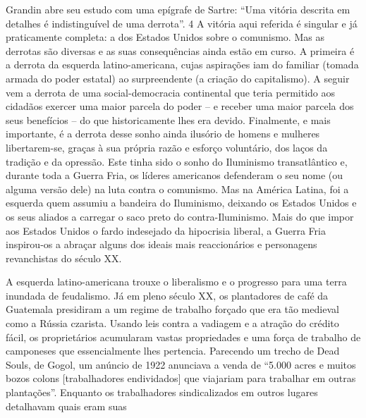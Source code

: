  \par 
Grandin abre seu estudo com uma epígrafe de Sartre: “Uma vitória descrita em detalhes é indistinguível de uma derrota”. {\color{blue}4} A vitória aqui referida é singular e já praticamente completa: a dos Estados Unidos sobre o comunismo. Mas as derrotas são diversas e as suas consequências ainda estão em curso. A primeira é a derrota da esquerda latino-americana, cujas aspirações iam do familiar (tomada armada do poder estatal) ao surpreendente (a criação do capitalismo). A seguir vem a derrota de uma social-democracia continental que teria permitido aos cidadãos exercer uma maior parcela do poder – e receber uma maior parcela dos seus benefícios – do que historicamente lhes era devido. Finalmente, e mais importante, é a derrota desse sonho ainda ilusório de homens e mulheres libertarem-se, graças à sua própria razão e esforço voluntário, dos laços da tradição e da opressão. Este tinha sido o sonho do Iluminismo transatlântico e, durante toda a Guerra Fria, os líderes americanos defenderam o seu nome (ou alguma versão dele) na luta contra o comunismo. Mas na América Latina, foi a esquerda quem assumiu a bandeira do Iluminismo, deixando os Estados Unidos e os seus aliados a carregar o saco preto do contra-Iluminismo. Mais do que impor aos Estados Unidos o fardo indesejado da hipocrisia liberal, a Guerra Fria inspirou-os a abraçar alguns dos ideais mais reaccionários e personagens revanchistas do século XX.
 \par 
A esquerda latino-americana trouxe o liberalismo e o progresso para uma terra inundada de feudalismo. Já em pleno século XX, os plantadores de café da Guatemala presidiram a um regime de trabalho forçado que era tão medieval como a Rússia czarista. Usando leis contra a vadiagem e a atração do crédito fácil, os proprietários acumularam vastas propriedades e uma força de trabalho de camponeses que essencialmente lhes pertencia. Parecendo um trecho de Dead Souls, de Gogol, um anúncio de 1922 anunciava a venda de “5.{\color{blue}000} acres e muitos bozos colons [trabalhadores endividados] que viajariam para trabalhar em outras plantações”. Enquanto os trabalhadores sindicalizados em outros lugares detalhavam quais eram suas
 \par 
